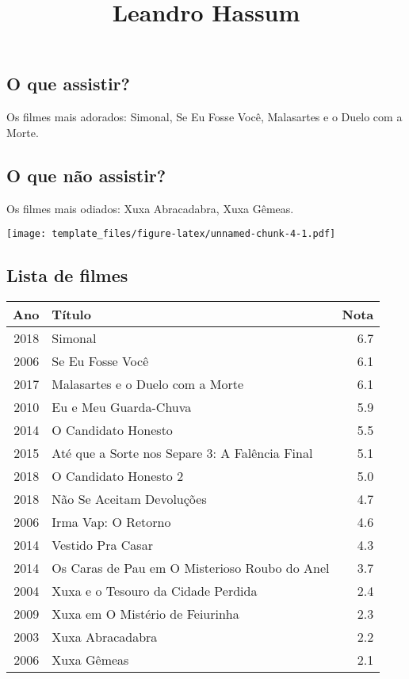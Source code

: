 \documentclass[
]{article}
\title{Leandro Hassum}
\author{}
\date{\vspace{-2.5em}}
\begin{document}
\maketitle

\hypertarget{o-que-assistir}{%
\subsection{O que assistir?}\label{o-que-assistir}}

Os filmes mais adorados: Simonal, Se Eu Fosse Você, Malasartes e o Duelo
com a Morte.

\hypertarget{o-que-nuxe3o-assistir}{%
\subsection{O que não assistir?}\label{o-que-nuxe3o-assistir}}

Os filmes mais odiados: Xuxa Abracadabra, Xuxa Gêmeas.

\texttt{[image: template\_files/figure-latex/unnamed-chunk-4-1.pdf]}

\newpage

\hypertarget{lista-de-filmes}{%
\subsection{Lista de filmes}\label{lista-de-filmes}}

\begin{longtable}[]{@{}rlr@{}}
\toprule
Ano & Título & Nota\tabularnewline
\midrule
\endhead
2018 & Simonal & 6.7\tabularnewline
2006 & Se Eu Fosse Você & 6.1\tabularnewline
2017 & Malasartes e o Duelo com a Morte & 6.1\tabularnewline
2010 & Eu e Meu Guarda-Chuva & 5.9\tabularnewline
2014 & O Candidato Honesto & 5.5\tabularnewline
2015 & Até que a Sorte nos Separe 3: A Falência Final &
5.1\tabularnewline
2018 & O Candidato Honesto 2 & 5.0\tabularnewline
2018 & Não Se Aceitam Devoluções & 4.7\tabularnewline
2006 & Irma Vap: O Retorno & 4.6\tabularnewline
2014 & Vestido Pra Casar & 4.3\tabularnewline
2014 & Os Caras de Pau em O Misterioso Roubo do Anel &
3.7\tabularnewline
2004 & Xuxa e o Tesouro da Cidade Perdida & 2.4\tabularnewline
2009 & Xuxa em O Mistério de Feiurinha & 2.3\tabularnewline
2003 & Xuxa Abracadabra & 2.2\tabularnewline
2006 & Xuxa Gêmeas & 2.1\tabularnewline
\bottomrule
\end{longtable}
\end{document}
